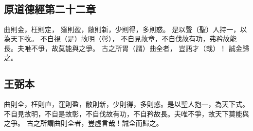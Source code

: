 ﻿%
%

\chapter{~}

\section{原道德經第二十二章}

\begin{withgezhu}

\zhsong


曲則金，枉則定，
窪則盈，敝則新，少則得，多則惑。
是以聲（\textcolor{tongjia-color}{聖}）人持一，以為天下牧。
不\colorbox{adding-color}{自}視（\textcolor{tongjia-color}{是}）故明（\textcolor{tongjia-color}{彰}），
不自見故章，不自伐故有功，弗矜故能長。夫唯不爭，故莫能與之爭。
古\colorbox{adding-color}{之所胃（\textcolor{tongjia-color}{謂}）曲全者}，
\colorbox{adding-color}{豈}語才（\textcolor{tongjia-color}{哉}）！
誠金歸之。

\end{withgezhu}

\section{王弼本}

\begin{withgezhu}

\zhsong

曲則全，枉則直，窪則盈，敝則新，少則得，多則惑。是以聖人抱一，為天下式。
不自見故明，不自是故彰，不自伐故有功，不自矜故長。夫唯不爭，故天下莫能與之爭。
古之所謂曲則全者，豈虛言哉！誠全而歸之。

\end{withgezhu}
